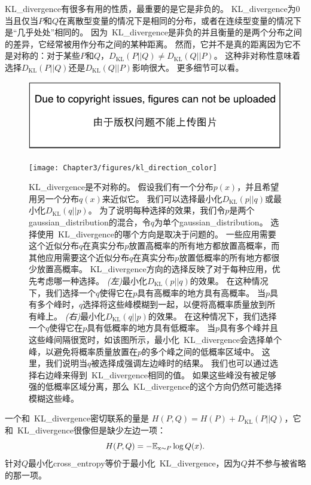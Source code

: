 \gls{KL_divergence}有很多有用的性质，最重要的是它是非负的。
\gls{KL_divergence}为0当且仅当$P$和$Q$在离散型变量的情况下是相同的分布，或者在连续型变量的情况下是``几乎处处''相同的。
因为~\gls{KL_divergence}是非负的并且衡量的是两个分布之间的差异，它经常被用作分布之间的某种距离。
然而，它并不是真的距离因为它不是对称的：对于某些$P$和$Q$，$D_\text{KL}(P||Q) \ne D_\text{KL}(Q||P)$。
这种非对称性意味着选择$D_\text{KL}(P||Q)$还是$D_\text{KL}(Q||P)$影响很大。
更多细节可以看。
\begin{figure}[!htb]
\ifOpenSource
\centerline{\includegraphics{figure.pdf}}
\else
\centerline{\texttt{[image: Chapter3/figures/kl\_direction\_color]}}
\fi
\caption{\gls{KL_divergence}是不对称的。
假设我们有一个分布$p(x)$，并且希望用另一个分布$q(x)$来近似它。
我们可以选择最小化$D_\text{KL}(p||q)$或最小化$D_\text{KL}(q||p)$。
为了说明每种选择的效果，我们令$p$是两个\gls{gaussian_distribution}的混合，令$q$为单个\gls{gaussian_distribution}。
选择使用~\gls{KL_divergence}的哪个方向是取决于问题的。
一些应用需要这个近似分布$q$在真实分布$p$放置高概率的所有地方都放置高概率，而其他应用需要这个近似分布$q$在真实分布$p$放置低概率的所有地方都很少放置高概率。 
\gls{KL_divergence}方向的选择反映了对于每种应用，优先考虑哪一种选择。
\emph{(左)}最小化$D_\text{KL}(p||q)$的效果。
在这种情况下，我们选择一个$q$使得它在$p$具有高概率的地方具有高概率。
当$p$具有多个峰时，$q$选择将这些峰模糊到一起，以便将高概率质量放到所有峰上。 
\emph{(右)}最小化$D_\text{KL}(q||p)$的效果。
在这种情况下，我们选择一个$q$使得它在$p$具有低概率的地方具有低概率。
当$p$具有多个峰并且这些峰间隔很宽时，如该图所示，最小化~\gls{KL_divergence}会选择单个峰，以避免将概率质量放置在$p$的多个峰之间的低概率区域中。
这里，我们说明当$q$被选择成强调左边峰时的结果。
我们也可以通过选择右边峰来得到~\gls{KL_divergence}相同的值。
如果这些峰没有被足够强的低概率区域分离，那么~\gls{KL_divergence}的这个方向仍然可能选择模糊这些峰。}
\label{fig:chap3_kl_direction_color}
\end{figure}



一个和~\gls{KL_divergence}密切联系的量是 $H(P, Q) = H(P) + D_\text{KL}(P||Q)$，它和~\gls{KL_divergence}很像但是缺少左边一项：
\begin{equation}
H(P, Q) = -\mathbb{E}_{\mathrm{x}\sim P} \log Q(x).
\end{equation}
针对$Q$最小化\gls{cross_entropy}等价于最小化~\gls{KL_divergence}，因为$Q$并不参与被省略的那一项。

